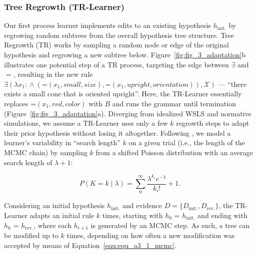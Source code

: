 \documentclass[doc,natbib,floatsintext]{apa7}
\newcommand{\xx}{\mathcal{X}} %
\newcommand{\dr}{D_{\mathrm{rev.}}}%
\newcommand{\di}{D_{\mathrm{init.}}}%
\newcommand{\hr}{h_{\mathrm{rev.}}}
\newcommand{\hi}{h_{\mathrm{init.}}}
\begin{document}
\subsubsection{Tree Regrowth (TR-Learner)}
Our first process learner implements edits to an existing hypothesis \(\hi\) by regrowing random subtrees from the overall hypothesis tree structure. Tree Regrowth (TR) works by sampling a random %
node or edge of the original hypothesis and regrowing a new subtree below. Figure~\ref{fig:fig_3_adaptation}b illustrates one potential step of a TR process, targeting the edge between $\exists$ and $=$, resulting in the new rule $\exists(\lambda x_{1}\!:\! \land(\text{=}(x_1, small, size), \text{=}(x_1, upright, orientation)),\xx) $ --- ``there exists a small cone that is oriented upright''. Here, the TR-Learner essentially replaces $\text{=}(x_1, red, color)$ with $B$ and runs the grammar until termination (Figure~\ref{fig:fig_3_adaptation}a). Diverging from idealized WSLS and normative simulations, we assume a TR-Learner uses only a few \(k\) regrowth steps to adapt their prior hypothesis without losing it altogether. Following \cite{bramley2017formalizing}, we model a learner's variability in ``search length'' \(k\) on a given trial (i.e., the length of the MCMC chain) by sampling $k$ from a shifted Poisson distribution with an average search length of $\lambda + 1$:

\begin{equation}
    P(K=k\mid\lambda) =\sum_{0}^{\infty}\frac{\lambda^{k_{i}}e^{-\lambda}}{k_{i}!} + 1.
\label{equ:equ_7_poisson}
\end{equation}

Considering an initial hypothesis \(\hi\) and evidence  \(D=\{\di,\dr\}\), the TR-Learner adapts an initial rule $k$ times, starting with $h_{0}$ = $\hi$ and ending with $h_{k}$ = $\hr$, where each $h_{i+1}$ is generated by an MCMC step. As such, a tree can be modified up to $k$ times, depending on how often a new modification was accepted by means of Equation~\ref{equ:equ_a3_1_mcmc}.
\end{document}
